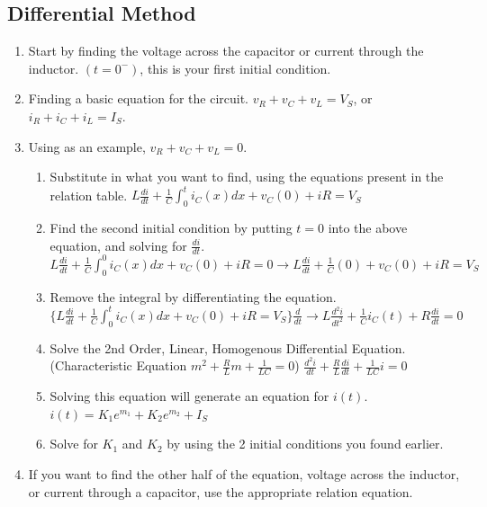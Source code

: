 \documentclass[10pt,letterpaper,twoside,notitlepage]{article}
\begin{document}
	\subsection*{Differential Method}
		\begin{enumerate}
			\item Start by finding the voltage across the capacitor or current through the inductor. $\left(t=0^-\right)$, this is your first initial condition.
			\item Finding a basic equation for the circuit. $v_R+v_C+v_L=V_S$, or $i_R+i_C+i_L=I_S$.
			\item  Using as an example, $v_R+v_C+v_L=0$.
			\begin{enumerate}
				\item Substitute in what you want to find, using the equations present in the relation table. \newline 
				$L\frac{di}{dt}+\frac{1}{C}\int_{0}^{t}i_{C}(x)dx+v_{C}(0)+iR=V_S$
				\item Find the second initial condition by putting $t=0$ into the above equation, and solving for $\frac{di}{dt}$. \newline
				$L\frac{di}{dt}+\frac{1}{C}\int_{0}^{0}i_{C}(x)dx+v_{C}(0)+iR=0 \longrightarrow L\frac{di}{dt}+\frac{1}{C}(0)+v_C(0)+iR=V_S$
				\item Remove the integral by differentiating the equation. \newline
				$\lbrace L\frac{di}{dt}+\frac{1}{C}\int_{0}^{t}i_{C}(x)dx+v_{C}(0)+iR=V_S\rbrace \frac{d}{dt} \longrightarrow L\frac{d^2i}{dt^2}+\frac{1}{C}i_{C}(t)+R\frac{di}{dt}=0$
				\item Solve the 2nd Order, Linear, Homogenous Differential Equation. (Characteristic Equation $m^2+\frac{R}{L}m+\frac{1}{LC}=0$)\newline
				$\frac{d^2i}{dt}+\frac{R}{L}\frac{di}{dt}+\frac{1}{LC}i=0$
				\item Solving this equation will generate an equation for $i(t)$.\newline
				$i(t)=K_1e^{m_1}+K_2e^{m_2}+I_S$
				\item Solve for $K_1$ and $K_2$ by using the 2 initial conditions you found earlier.
			\end{enumerate}
			\item If you want to find the other half of the equation, voltage across the inductor, or current through a capacitor, use the appropriate relation equation.
		\end{enumerate}
	
\end{document}
